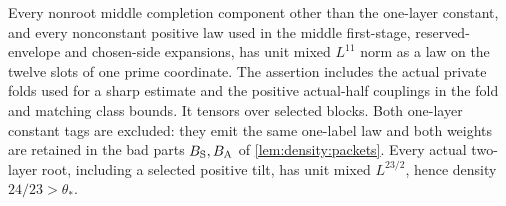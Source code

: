 \begin{lemma}\label{lem:density:middle-catalog}
Every nonroot middle completion component other than the one-layer
constant, and every nonconstant positive law used in the middle
first-stage, reserved-envelope and chosen-side expansions, has unit mixed $L^{11}$ norm as a law on the twelve slots of one prime coordinate. The assertion includes
the actual private folds used for a sharp estimate and the positive
actual-half couplings in the fold and matching class bounds.
It tensors over selected blocks. Both one-layer constant tags are
excluded: they emit the same one-label law and both weights are retained in the bad parts $B_{\rm S},B_{\rm A}$ of \cref{lem:density:packets}.
Every actual two-layer root, including a selected positive tilt, has
unit mixed $L^{23/2}$, hence density $24/23>\theta_*$.
\end{lemma}

